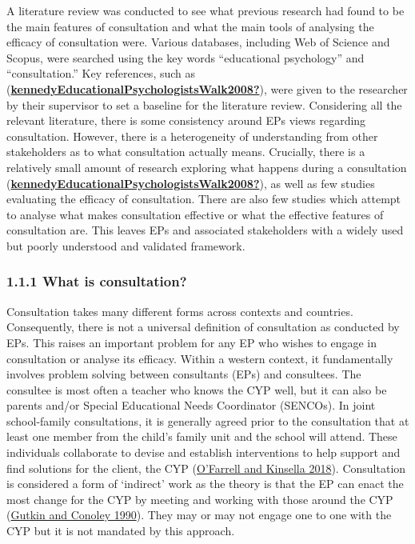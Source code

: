 \documentclass[
]{article}
\begin{document}
A literature review was conducted to see what previous research had
found to be the main features of consultation and what the main tools of
analysing the efficacy of consultation were. Various databases,
including Web of Science and Scopus, were searched using the key words
``educational psychology'' and ``consultation.'' Key references, such as
(\protect\hyperlink{ref-kennedyEducationalPsychologistsWalk2008}{\textbf{kennedyEducationalPsychologistsWalk2008?}}),
were given to the researcher by their supervisor to set a baseline for
the literature review. Considering all the relevant literature, there is
some consistency around EPs views regarding consultation. However, there
is a heterogeneity of understanding from other stakeholders as to what
consultation actually means. Crucially, there is a relatively small
amount of research exploring what happens during a consultation
(\protect\hyperlink{ref-kennedyEducationalPsychologistsWalk2008}{\textbf{kennedyEducationalPsychologistsWalk2008?}}),
as well as few studies evaluating the efficacy of consultation. There
are also few studies which attempt to analyse what makes consultation
effective or what the effective features of consultation are. This
leaves EPs and associated stakeholders with a widely used but poorly
understood and validated framework.

\hypertarget{what-is-consultation}{%
\subsubsection{1.1.1 What is consultation?}\label{what-is-consultation}}

Consultation takes many different forms across contexts and countries.
Consequently, there is not a universal definition of consultation as
conducted by EPs. This raises an important problem for any EP who wishes
to engage in consultation or analyse its efficacy. Within a western
context, it fundamentally involves problem solving between consultants
(EPs) and consultees. The consultee is most often a teacher who knows
the CYP well, but it can also be parents and/or Special Educational
Needs Coordinator (SENCOs). In joint school-family consultations, it is
generally agreed prior to the consultation that at least one member from
the child's family unit and the school will attend. These individuals
collaborate to devise and establish interventions to help support and
find solutions for the client, the CYP
(\protect\hyperlink{ref-ofarrellResearchExploringParents2018}{O'Farrell
and Kinsella 2018}). Consultation is considered a form of `indirect'
work as the theory is that the EP can enact the most change for the CYP
by meeting and working with those around the CYP
(\protect\hyperlink{ref-gutkinReconceptualizingSchoolPsychology1990}{Gutkin
and Conoley 1990}). They may or may not engage one to one with the CYP
but it is not mandated by this approach.
\end{document}
